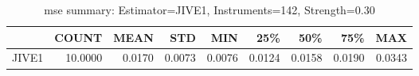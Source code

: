 \begin{table}[ht]
\centering
\caption{mse summary: Estimator=JIVE1, Instruments=142, Strength=0.30}
\begin{tabular}{lrrrrrrrr}
\toprule
 & COUNT & MEAN & STD & MIN & 25\% & 50\% & 75\% & MAX \\
\midrule
JIVE1 & 10.0000 & 0.0170 & 0.0073 & 0.0076 & 0.0124 & 0.0158 & 0.0190 & 0.0343 \\
\bottomrule
\end{tabular}
\end{table}
